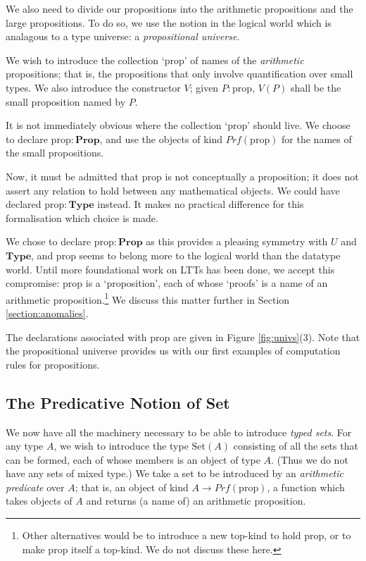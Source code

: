 \documentclass[acmtocl]{acmtrans2m}
\newcommand{\Type}{\mathbf{Type}}
\newcommand{\Prop}{\mathbf{Prop}}
\newcommand{\Prf}[1]{Prf \left( {#1} \right)}
\newcommand{\Set}[1]{\mathrm{Set} \left( {#1} \right)}
\newcommand{\p}{\mathrm{prop}}
\begin{document}
We also need to divide our propositions into the arithmetic propositions
and the large propositions.  To do so, we use the notion
in the logical world which is analagous to a type universe: a \emph{propositional
universe}.

We wish to introduce the collection `$\p$' of names of the
\emph{arithmetic} propositions; that is, the propositions that only
involve quantification over small types.  We also introduce the constructor $V$; given $P : \p$, $V(P)$ shall be the small proposition named by $P$.

It is not immediately
obvious where the collection `$\p$' should live.
We choose to declare $\p : \Prop$, and use the objects of kind $\Prf{\p}$ for the names of the small propositions.

Now, it must be admitted that
$\p$ is not conceptually a proposition; it does not assert any
relation to hold between any mathematical objects.
We could have declared $\p : \Type$ instead.
It makes no
practical difference for this formalisation which choice is made.

We chose to declare $\p : \Prop$ as this provides a pleasing symmetry with
$U$ and $\Type$, and $\p$ seems to belong more to the logical world than the datatype world.
Until more foundational work on LTTs has been done, we accept this compromise: $\p$ is
a `proposition', each of whose `proofs' is a name of an arithmetic
proposition.\footnote{Other alternatives would be to introduce a new
top-kind to hold $\p$, or to make $\p$ itself a top-kind.  We do not discuss these here.}  We discuss this matter further in Section \ref{section:anomalies}.

The declarations associated with $\p$ are given in Figure \ref{fig:univs}(3). Note that the
propositional universe provides us with our first examples of
computation rules for propositions.

\subsection{The Predicative Notion of Set}
\label{section:set}

We now have all the machinery necessary to be able to introduce
\emph{typed sets}.  For any type $A$, we wish to introduce the type
$\Set{A}$ consisting of all the sets that can be formed, each of
whose members is an object of type $A$.  (Thus we do not have any
sets of mixed type.)  We take a set to be introduced by an
\emph{arithmetic predicate} over $A$; that is, an object of kind $A \rightarrow
\Prf{\p}$, a function which takes objects of $A$ and returns (a name of) an
arithmetic proposition.
\end{document}
